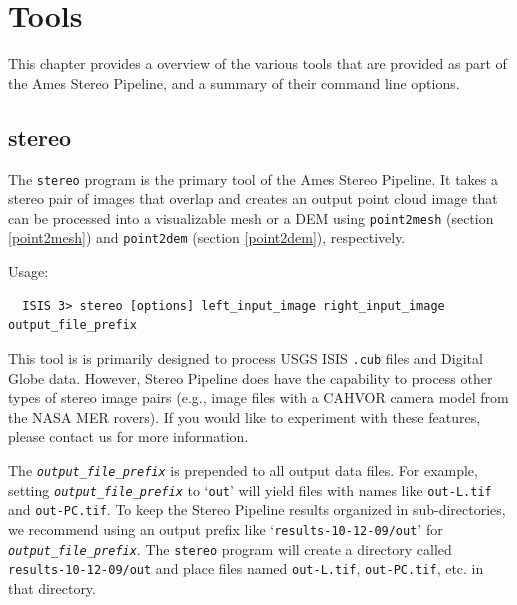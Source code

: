 \chapter{Tools}

This chapter provides a overview of the various tools that are
provided as part of the Ames Stereo Pipeline, and a summary of their
command line options.


\section{stereo}
\label{stereo}

The \texttt{stereo} program is the primary tool of the Ames Stereo
Pipeline. It takes a stereo pair of images that overlap and creates an
output point cloud image that can be processed into a visualizable mesh
or a DEM using \texttt{point2mesh} (section \ref{point2mesh}) and
\texttt{point2dem} (section \ref{point2dem}), respectively.

\medskip

Usage:
\begin{verbatim}
  ISIS 3> stereo [options] left_input_image right_input_image output_file_prefix
\end{verbatim}

This tool is is primarily designed to process USGS ISIS \texttt{.cub}
files and Digital Globe data. However, Stereo Pipeline
does have the capability to process other types of stereo image pairs
(e.g., image files with a CAHVOR camera model from the NASA MER
rovers). If you would like to experiment with these features, please
contact us for more information.

The \texttt{\textit{output\_file\_prefix}} is prepended to all
output data files.  For example, setting \texttt{\textit{output\_file\_prefix}}
to `\texttt{out}' will yield files with names like \texttt{out-L.tif}
and \texttt{out-PC.tif}.  To keep the Stereo Pipeline results organized
in sub-directories, we recommend using an output prefix like
`\texttt{results-10-12-09/out}' for \texttt{\textit{output\_file\_prefix}}.  The
\texttt{stereo} program will create a directory called
\texttt{results-10-12-09/out} and place files named \texttt{out-L.tif},
\texttt{out-PC.tif}, etc. in that directory.

